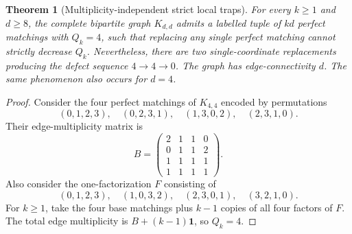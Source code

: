 \documentclass[10pt]{article}
\newtheorem{theorem}{Theorem}[section]
\begin{document}
\begin{theorem}[Multiplicity-independent strict local traps]\label{thm:trap}
For every $k\ge1$ and $d\ge8$, the complete bipartite graph $K_{d,d}$ admits a labelled tuple of $kd$ perfect matchings with $Q_k=4$, such that replacing any single perfect matching cannot strictly decrease $Q_k$. Nevertheless, there are two single-coordinate replacements producing the defect sequence $4\to4\to0$. The graph has edge-connectivity $d$. The same phenomenon also occurs for $d=4$.
\end{theorem}
\begin{proof}
Consider the four perfect matchings of $K_{4,4}$ encoded by permutations
\begin{equation}\label{eq:base}
(0,1,2,3),\quad(0,2,3,1),\quad(1,3,0,2),\quad(2,3,1,0).
\end{equation}
Their edge-multiplicity matrix is
\[B=\begin{pmatrix}2&1&1&0\\0&1&1&2\\1&1&1&1\\1&1&1&1\end{pmatrix}.\]
Also consider the one-factorization $F$ consisting of
\begin{equation}\label{eq:factor}
(0,1,2,3),\quad(1,0,3,2),\quad(2,3,0,1),\quad(3,2,1,0).
\end{equation}
For $k\ge1$, take the four base matchings plus $k-1$ copies of all four factors of $F$. The total edge multiplicity is $B+(k-1)\mathbf1$, so $Q_k=4$.


\end{proof}
\end{document}
